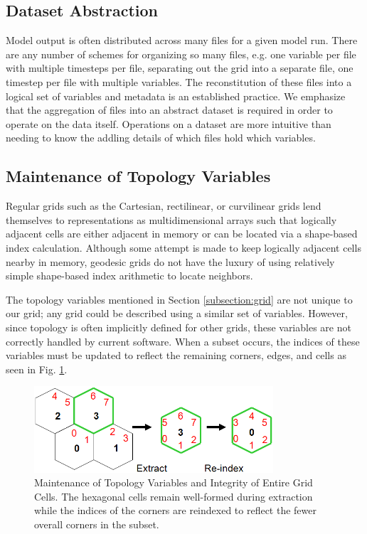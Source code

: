 \subsection{Dataset Abstraction}

Model output is often distributed across many files for a given model run.
There are any number of schemes for organizing so many files, e.g. one
variable per file with multiple timesteps per file, separating out the grid
into a separate file, one timestep per file with multiple variables.  The
reconstitution of these files into a logical set of variables and metadata is
an established practice\cite{NcML,THREDDS}.  We emphasize that the aggregation
of files into an abstract dataset is required in order to operate on the data
itself.  Operations on a dataset are more intuitive than needing to know the
addling details of which files hold which variables.

\subsection{Maintenance of Topology Variables}

Regular grids such as the Cartesian, rectilinear, or curvilinear grids lend
themselves to representations as multidimensional arrays such that logically
adjacent cells are either adjacent in memory or can be located via a
shape-based index calculation.  Although some attempt is made to keep
logically adjacent cells nearby in memory, geodesic grids do not have the
luxury of using relatively simple shape-based index arithmetic to locate
neighbors.

The topology variables mentioned in Section \ref{subsection:grid} are not
unique to our grid; any grid could be described using a similar set of
variables.  However, since topology is often implicitly defined for other
grids, these variables are not correctly handled by current software.  When a
subset occurs, the indices of these variables must be updated to reflect the
remaining corners, edges, and cells as seen in Fig. \ref{fig:subset}.

\begin{figure}[!t]
\center
\includegraphics[width=3.5in]{images/Subset0}
\caption{Maintenance of Topology Variables and Integrity of Entire Grid Cells.
The hexagonal cells remain well-formed during extraction while the indices of
the corners are reindexed to reflect the fewer overall corners in the subset.}
\label{fig:subset}
\end{figure}

